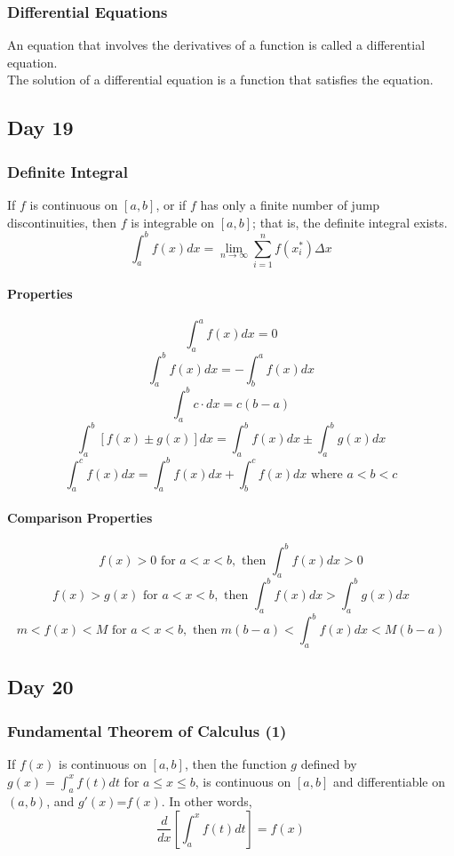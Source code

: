 \documentclass[12pt]{article}
\begin{document}
\subsubsection{Differential Equations} An equation that involves the derivatives of a function is called a differential equation.\\
The solution of a differential equation is a function that satisfies the equation. 

\subsection{Day 19}

\subsubsection{Definite Integral} 

If $f$ is continuous on $[a,b]$, or if $f$ has only a finite number of jump discontinuities, then $f$ is integrable on $[a,b]$; that is, the definite integral exists.
$$\int_a^b f(x) dx=\lim_{n\to \infty} \sum_{i=1}^{n} f(x_i^*)\Delta x$$


\paragraph{Properties}

$$\int_a^a f(x) dx = 0$$
$$\int_a^b f(x) dx = -\int_b^a f(x) dx$$
$$\int_a^b c \cdot dx = c(b-a)$$
$$\int_a^b \left[f(x) \pm g(x)\right] dx = \int_a^b f(x) dx \pm \int_a^b g(x) dx$$
$$\int_a^c f(x) dx = \int_a^b f(x) dx + \int_b^c f(x) dx \text{ where } a < b < c$$

\paragraph{Comparison Properties}

$$f(x)>0 \text{ for } a < x < b, \text{ then } \int_a^b f(x)dx > 0$$ 
$$f(x)>g(x) \text{ for } a < x < b, \text{ then } \int_a^b f(x)dx > \int_a^b g(x)dx$$ 
$$m<f(x)<M \text{ for } a < x < b, \text{ then } m(b-a) < \int_a^b f(x)dx < M(b-a)$$ 

\subsection{Day 20}

\subsubsection{Fundamental Theorem of Calculus (1)} 
If $f(x)$ is continuous on $[a,b]$, then the function $g$ defined by  $g(x) = \int_a^x f(t) dt$ for $a \leq x \leq b$, is continuous on $[a,b]$ and differentiable on $(a,b)$, and $g'(x)$=$f(x)$. In other words, 
$$\frac{d}{dx} \left[\int_a^x f(t)dt \right] = f(x)$$
\end{document}
